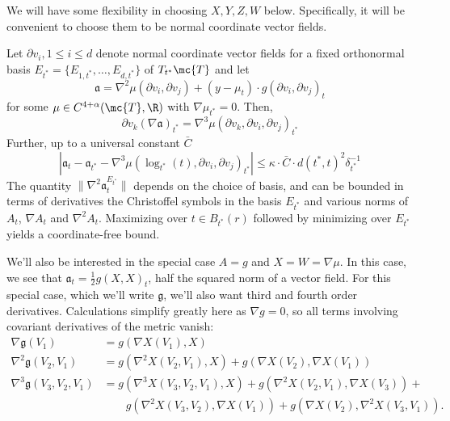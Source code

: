 \documentclass{article}
\begin{document}
We will have some flexibility in choosing $X, Y, Z, W$ below. Specifically, it will be convenient
to choose them to be normal coordinate vector fields.

\begin{lemma}
\label{lem:normal:taylor:tensor}
  Let $\partial v_i, 1 \leq i \leq d$ denote normal coordinate vector fields for
  a fixed orthonormal basis $E_{t^*}=\{E_{1,t^*},\dots, E_{d,t^*}\}$ of $T_{t^*}\mc{T}$ and let
  $$\mathfrak{a}=\nabla^2 \mu(\partial v_i, \partial v_j) + (y - \mu_t) \cdot g(\partial v_i, \partial v_j)_t$$
  for some $\mu \in C^{4+\alpha}(\mc{T},\R)$ with $\nabla \mu_{t^*}=0$. Then,
  \begin{equation}
\partial v_k(\nabla \mathfrak{a})_{t^*} = \nabla^3 \mu(\partial v_k, \partial v_i, \partial v_j)_{t^*}
    \end{equation}
  Further, up to a universal constant $\bar{C}$
  \begin{equation}
    \left|\mathfrak{a}_t - \mathfrak{a}_{t^*} - \nabla^3 \mu(\log_{t^*}(t), \partial v_i, \partial v_j)_{t^*}
    \right| \leq \kappa \cdot \bar{C} \cdot d(t^*,t)^2 \delta_{t^*}^{-1}
    \end{equation}
  The quantity $\|\nabla^2 \mathfrak{a}^{E_{t^*}}_t\|$ depends on the choice of basis, and can be bounded in terms of
  derivatives the Christoffel symbols in the basis $E_{t^*}$ and various norms of $A_t$, $\nabla A_t$ and $\nabla^2 A_t$. Maximizing over $t \in B_{t^*}(r)$ followed by minimizing over $E_{t^*}$ yields a coordinate-free bound.
  \end{lemma}

We'll also be interested in the special case $A=g$ and $X=W=\nabla \mu$.
In this case, we see that $\mathfrak{a}_t = \frac{1}{2}g(X,X)_t$, half the squared norm
of a vector field. For this special case, which we'll write $\mathfrak{g}$, we'll also want third and fourth order derivatives. Calculations simplify greatly here
as $\nabla g=0$, so all terms involving covariant derivatives of the metric vanish:
$$
\begin{aligned}
\nabla \mathfrak{g}(V_1) &= g(\nabla X(V_1), X) \\
\nabla^2 \mathfrak{g}(V_2, V_1) &= g(\nabla^2 X(V_2, V_1), X) + g(\nabla X(V_2), \nabla X(V_1)) \\
  \nabla^3 \mathfrak{g}(V_3, V_2, V_1)& = g(\nabla^3 X(V_3, V_2, V_1), X) + g(\nabla^2  X(V_2, V_1), \nabla X(V_3)) +  \\
  & \qquad g(\nabla^2 X(V_3, V_2), \nabla X(V_1)) + g(\nabla X(V_2), \nabla^2 X(V_3, V_1)). \\
\end{aligned}
$$
\end{document}
